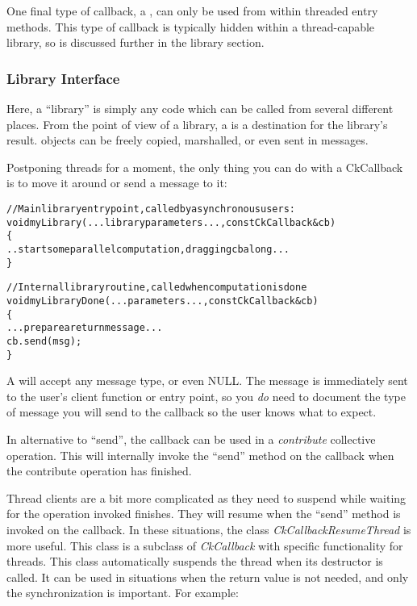 One final type of callback, a , 
can only be used from within threaded entry methods.  This type of callback
is typically hidden within a thread-capable library, so is discussed further
in the library section.


\subsubsection{Library Interface}

\label{libraryInterface}

Here, a ``library'' is simply any code which can be called from several
different places.  From the point of view of a library, a 
is a destination for the library's result.   objects can
be freely copied, marshalled, or even sent in messages.

Postponing threads for a moment, the only thing you can do 
with a CkCallback is to move it around or send a message to it:

\begin{alltt}
//Main library entry point, called by asynchronous users:
void myLibrary(...library parameters...,const CkCallback \&cb) 
\{
  ..start some parallel computation, dragging cb along...
\}

//Internal library routine, called when computation is done
void myLibraryDone(...parameters...,const CkCallback \&cb)
\{
  ...prepare a return message...
  cb.send(msg);
\}
\end{alltt}

A  will accept any message type, or even NULL.  The
message is immediately sent to the user's client function or entry point,
so you {\em do} need to document the type of message you will send to the 
callback so the user knows what to expect.

In alternative to ``send'', the callback can be used in a {\em contribute}
collective operation. This will internally invoke the ``send'' method on the
callback when the contribute operation has finished.

Thread clients are a bit more complicated as they need to suspend while waiting
for the operation invoked finishes. They will resume when the ``send'' method is
invoked on the callback.
In these situations, the class {\em CkCallbackResumeThread} is more useful. This
class is a subclass of {\em CkCallback} with specific functionality for threads.
This class automatically suspends the thread when its destructor is called. It
can be used in situations when the return value is not needed, and only the
synchronization is important. For example:

